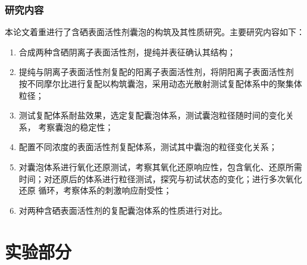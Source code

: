 \documentclass[bachelor,winfonts,replaceperiod]{jnuthesis}
\begin{document}
    \subsection{研究内容}
    本论文着重进行了含硒表面活性剂囊泡的构筑及其性质研究。主要研究内容如下：
    \begin{enumerate}
        \item 合成两种含硒阴离子表面活性剂，提纯并表征确认其结构；
        \item 提纯与阴离子表面活性剂复配的阳离子表面活性剂，将阴阳离子表面活性剂
        按不同摩尔比进行复配以构筑囊泡，采用动态光散射测试复配体系中的聚集体粒径；
        \item 测试复配体系耐盐效果，选定复配囊泡体系，测试囊泡粒径随时间的变化关系，
        考察囊泡的稳定性；
        \item 配置不同浓度的表面活性剂复配体系，测试其中囊泡的粒径变化关系；
        \item 对囊泡体系进行氧化还原测试，考察其氧化还原响应性，包含氧化、还原所需
        时间；对还原后的体系进行粒径测试，探究与初试状态的变化；进行多次氧化还原
        循环，考察体系的刺激响应耐受性；
        \item 对两种含硒表面活性剂的复配囊泡体系的性质进行对比。
    \end{enumerate}
    
    \chapter{实验部分}\label{chapter:experiment}
\end{document}
